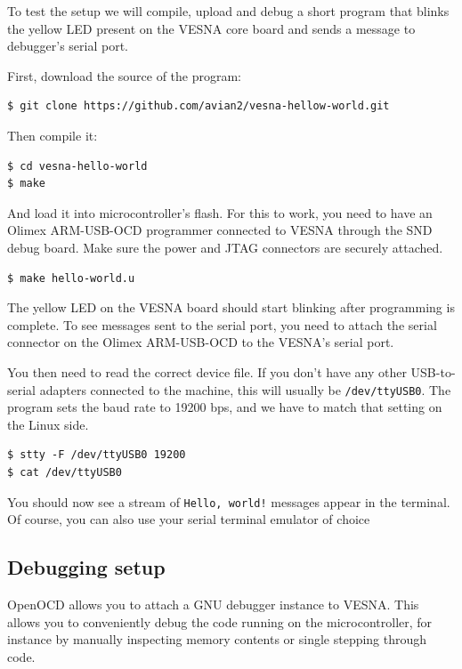 \documentclass[a4paper, 10pt]{article}
\begin{document}
To test the setup we will compile, upload and debug a short program that blinks
the yellow LED present on the VESNA core board and sends a message to debugger's
serial port.

First, download the source of the program:

\begin{verbatim}
$ git clone https://github.com/avian2/vesna-hellow-world.git
\end{verbatim}

Then compile it:

\begin{verbatim}
$ cd vesna-hello-world
$ make
\end{verbatim}

And load it into microcontroller's flash. For this to work, you need to have an
Olimex ARM-USB-OCD programmer connected to VESNA through the SND debug board.
Make sure the power and JTAG connectors are securely attached.

\begin{verbatim}
$ make hello-world.u
\end{verbatim}

The yellow LED on the VESNA board should start blinking after programming is complete.
To see messages sent to the serial port, you need to attach the serial
connector on the Olimex ARM-USB-OCD to the VESNA's serial port.

You then need to read the correct device file. If you don't have any
other USB-to-serial adapters connected to the machine, this will usually be
\verb|/dev/ttyUSB0|. The program sets the baud rate to 19200 bps, and we have to
match that setting on the Linux side.

\begin{verbatim}
$ stty -F /dev/ttyUSB0 19200
$ cat /dev/ttyUSB0
\end{verbatim}

You should now see a stream of \verb|Hello, world!| messages appear in the
terminal. Of course, you can also use your serial terminal emulator of choice

\subsection{Debugging setup}

OpenOCD allows you to attach a GNU debugger instance to VESNA. This allows you
to conveniently debug the code running on the microcontroller, for instance by
manually inspecting memory contents or single stepping through code.
\end{document}
